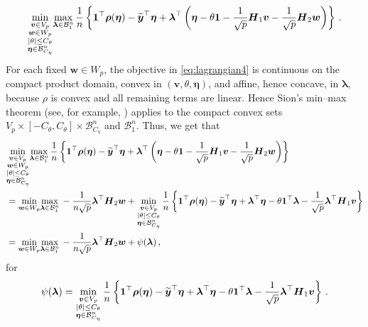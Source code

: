 \documentclass{article}
\makeatletter
\theoremstyle{definition}
\newcommand{\abs}[1]{%
	\ensuremath{%
		\if@display
		\left| #1 \right|
		\else
		\lvert #1 \rvert
		\fi
	}%
}
\newcommand*{\bb}{\boldsymbol}
\def\bw {\bb{w}}
\def\bH {\bb{H}}
\def\bv{\bb{v}}
\def\bYtil{\widetilde{\bb{y}}}
\def\bH{\bb{H}}
\def\blambda{\bb{\lambda}}
\makeatother
\begin{document}
\begin{bibunit}
\begin{equation}
    \underset{\substack{\bv \in V_p \\ \bw \in W_p \\
    \abs{\theta} \leq C_\theta \\ \bb{\eta} \in \mathcal{B}^n_{C_\eta}} }{\min}
    \underset{\blambda \in \mathcal{B}^n_1}{\max} \,  \frac{1}{n}
    \left\{\bb{1}^\top \bb{\rho}( \bb{\eta})-  \bYtil^\top\bb{\eta}+ \bb{\lambda}^\top \left(\bb{\eta} -
    \theta \bb{1} - \frac{1}{\sqrt{p}} \bb{H}_1 \bv - \frac{1}{\sqrt{p}}\bb{H}_2 \bw \right) \right\} \,.
\end{equation}
For each fixed $\bw\in W_p$, the objective in
\eqref{eq:lagrangian4} is continuous on the compact product domain,
convex in $(\bv,\theta,\bb\eta)$, and affine, hence concave, in
$\blambda$, because $\rho$ is convex and all remaining terms are
linear. Hence Sion's min--max theorem
(see, for example, \citealt[][Theorem~3]{simons:1995}) applies
to the compact convex sets
$V_p\times[-C_\theta,C_\theta]\times\mathcal B^n_{C_\eta}$
and $\mathcal B_1^n$.
Thus, we get that
\begin{equation}
\label{eq:lagrangian5}
    \begin{aligned}
        &\underset{\substack{\bv \in V_p\\ \bw \in W_p\\ \abs{\theta} \leq C_\theta \\ \bb{\eta} \in
        \mathcal{B}^n_{C_\eta}}}{\min} \underset{\blambda \in \mathcal{B}^n_1}{\max} \,  \frac{1}{n}
        \left\{\bb{1}^\top \bb{\rho}( \bb{\eta})-  \bYtil^\top\bb{\eta}+ \bb{\lambda}^\top \left(\bb{\eta} -
        \theta \bb{1} - \frac{1}{\sqrt{p}} \bb{H}_1 \bv - \frac{1}{\sqrt{p}}\bb{H}_2 \bw \right) \right\} \\
        &= \underset{\substack{ \bw \in W_p}}{\min} \underset{\blambda \in \mathcal{B}^n_1}{\max} \,
        -\frac{1}{n \sqrt{p}} \blambda^\top \bH_2 \bw  + \underset{\substack{\bv \in V_p\\ \abs{\theta}
        \leq C_\theta \\ \bb{\eta} \in \mathcal{B}^n_{C_\eta}}}{\min} \, \frac{1}{n} \left\{\bb 1^\top \bb \rho(\bb{\eta}) -
        \bYtil^\top \bb{\eta} +\blambda^\top \bb{\eta} - \theta \bb 1^\top \blambda - \frac{1}{\sqrt{p}}\blambda^\top \bH_1 \bv  \right\} \\
        &= \underset{\substack{ \bw \in W_p}}{\min} \underset{\blambda \in \mathcal{B}^n_1}{\max} \,
        -\frac{1}{n \sqrt{p}} \blambda^\top \bH_2 \bw  + \psi(\blambda) \,,
    \end{aligned}
\end{equation}
for
$$
	\psi(\blambda) = \underset{\substack{\bv \in V_p\\ \abs{\theta}
        \leq C_\theta \\ \bb{\eta} \in \mathcal{B}^n_{C_\eta}}}{\min} \, \frac{1}{n} \left\{\bb 1^\top \bb \rho(\bb{\eta}) -
        \bYtil^\top \bb{\eta} +\blambda^\top \bb{\eta} - \theta \bb 1^\top \blambda - \frac{1}{\sqrt{p}}\blambda^\top \bH_1 \bv  \right\}  \,.
	$$



\end{bibunit}
\end{document}
